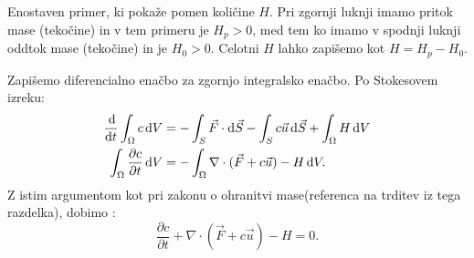 \documentclass[mat2, tisk]{fmfdelo}
\begin{document}
\begin{primer}
Enostaven primer, ki pokaže pomen količine $H$. Pri zgornji luknji imamo pritok 
mase (tekočine) in v tem primeru je $H_{p} > 0$, med tem ko imamo v spodnji luknji oddtok
mase (tekočine) in je $H_{0} > 0$. Celotni $H$ lahko zapišemo kot $H = H_p - H_0$.
\end{primer}
Zapišemo diferencialno enačbo za zgornjo integralsko enačbo. Po Stokesovem izreku:
\begin{align*}
\frac{\dif}{\dif t} \int_{\Omega} c \dif V &= - \int_S \vec{F} \cdot \dif \vec{S} - 
\int_S c \vec{u}  \dif \vec{S} + \int_\Omega H \dif V \\
\int_{\Omega} \frac{\partial c}{\partial t} \dif V &= - \int_\Omega \nabla\cdot(\vec{F} + c \vec{u}) - H \dif V .
\end{align*}
Z istim argumentom kot pri zakonu o ohranitvi mase(referenca na trditev iz tega razdelka), dobimo :
\begin{equation}
\frac{\partial c}{\partial t} + \nabla \cdot (\vec{F} + c\vec{u}) - H = 0.
\end{equation}
\end{document}
